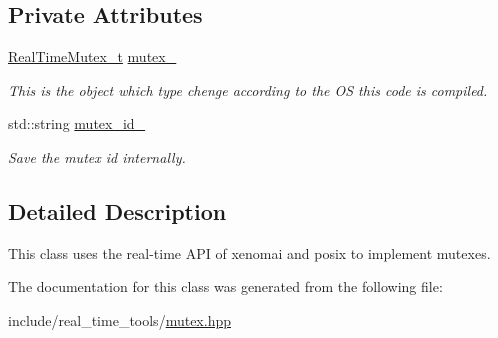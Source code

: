 \subsection*{Private Attributes}
\begin{DoxyCompactItemize}
\item 
\mbox{\label{classreal__time__tools_1_1RealTimeMutex_a21e60b2fffe69eba625590fa3201404b}} 
\hyperlink{mutex_8hpp_a1ddc3c11c7ede92bbf52bafb61009ba2}{Real\+Time\+Mutex\+\_\+t} \hyperlink{classreal__time__tools_1_1RealTimeMutex_a21e60b2fffe69eba625590fa3201404b}{mutex\+\_\+}
\begin{DoxyCompactList}\small\item\em This is the object which type chenge according to the OS this code is compiled. \end{DoxyCompactList}\item 
\mbox{\label{classreal__time__tools_1_1RealTimeMutex_a42edb13b07a983e48d9348bb20465962}} 
std\+::string \hyperlink{classreal__time__tools_1_1RealTimeMutex_a42edb13b07a983e48d9348bb20465962}{mutex\+\_\+id\+\_\+}
\begin{DoxyCompactList}\small\item\em Save the mutex id internally. \end{DoxyCompactList}\end{DoxyCompactItemize}


\subsection{Detailed Description}
This class uses the real-\/time A\+PI of xenomai and posix to implement mutexes. 

The documentation for this class was generated from the following file\+:\begin{DoxyCompactItemize}
\item 
include/real\+\_\+time\+\_\+tools/\hyperlink{mutex_8hpp}{mutex.\+hpp}\end{DoxyCompactItemize}
